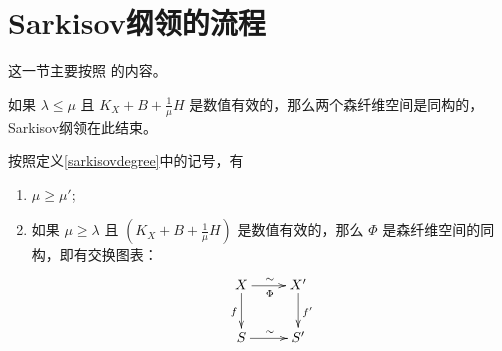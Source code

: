 \section{Sarkisov纲领的流程}
这一节主要按照 \cite[\S1]{brunoLogSarkisovProgram1995}的内容。

如果 $ \lambda\leqslant\mu $ 且 $ K_X+B+\frac{1}{\mu}H $ 是数值有效的，那么两个森纤维空间是同构的，Sarkisov纲领在此结束。
\begin{theorem}\label{nfi}
  按照定义\ref{sarkisovdegree}中的记号，有
  \begin{enumerate}
    \item $ \mu\geqslant \mu' $;
    \item 如果 $ \mu \geqslant \lambda $ 且 $ (K_X+B+\frac{1}{\mu} H) $ 是数值有效的，那么 $\Phi$ 是森纤维空间的同构，即有交换图表：
          \[ \xymatrix{
              X\ar[r]^\sim_{\Phi}\ar[d]_f&X'\ar[d]^{f'}\\
              S\ar[r]^\sim& S' } \]
  \end{enumerate}
\end{theorem}

